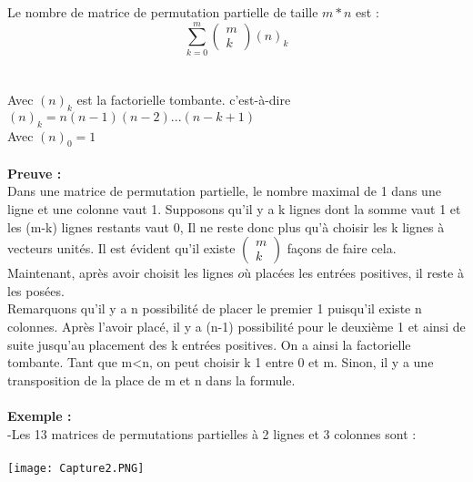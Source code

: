 \documentclass{book}
\begin{document}
Le nombre de matrice de permutation partielle de taille $m*n$ est : \\
\begin{equation}
\sum_{k=0}^{m}\begin{pmatrix}
 m\\k
 \end{pmatrix}
 (n)_k
\end{equation}
\\\\ Avec $(n)_k$ est la factorielle tombante. c'est-à-dire $(n)_k=n(n-1)(n-2)...(n-k+1)$\\
Avec $(n)_0=1$ \\\\
\textbf{Preuve :}\\
Dans une matrice de permutation partielle, le nombre maximal de 1 dans une ligne et une colonne vaut 1. Supposons qu'il y a k lignes dont la somme vaut 1 et les (m-k) lignes restants vaut 0, Il ne reste donc plus qu'à choisir les k lignes à vecteurs unités. Il est évident qu'il existe $\begin{pmatrix}
 m\\k
 \end{pmatrix}$ façons de faire cela. Maintenant, après avoir choisit les lignes $où$ placées les entrées positives, il reste à les posées. \\ Remarquons qu'il y a n possibilité de placer le premier 1 puisqu'il existe n colonnes. Après l'avoir placé, il y a (n-1) possibilité pour le deuxième 1 et ainsi de suite jusqu'au placement des k entrées positives. On a ainsi la factorielle tombante. Tant que m<n, on peut choisir k 1 entre 0 et m. Sinon, il y a une transposition de la place de m et n dans la formule. \\\\
 \textbf{Exemple :}\\
 -Les 13 matrices de permutations partielles à 2 lignes et 3 colonnes sont : \\\\
 \texttt{[image: Capture2.PNG]}
\end{document}

